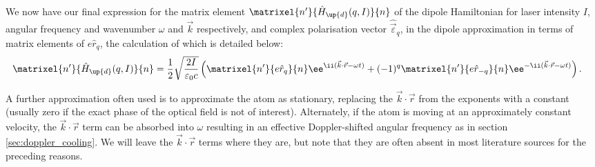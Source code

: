 We now have our final expression for the matrix element $\matrixel{n^\prime}{\hat H_\up{d}(q,I)}{n}$ of the dipole Hamiltonian for laser intensity $I$, angular frequency and wavenumber $\omega$ and $\vec k$ respectively, and complex polarisation vector $\hat{\vec\varepsilon}_q$, in the dipole approximation in terms of matrix elements of $e\hat r_q$, the calculation of which is detailed below:
\begin{align}\label{eq:diple_matrixel_withminus}
\matrixel{n^\prime}{\hat H_\up{d}(q,I)}{n} &= 
\frac12\sqrt{\frac{2I}{\varepsilon_0 c}}\left(
\matrixel{n^\prime}
  {e\hat r_q}
  {n}\ee^{\ii(\vec k \cdot \vec r - \omega t)}
+(-1)^q
\matrixel{n^\prime}
  {e\hat r_{-q}}
  {n} \ee^{-\ii(\vec k \cdot \vec r - \omega t)}\right).
\end{align}

A further approximation often used is to approximate the atom as stationary, replacing the $\vec k\cdot\vec r$ from the exponents with a constant (usually zero if the exact phase of the optical field is not of interest). Alternately, if the atom is moving at an approximately constant velocity, the $\vec k \cdot\vec r$ term can be absorbed into $\omega$ resulting in an effective Doppler-shifted angular frequency as in section \ref{sec:doppler_cooling}. We will leave the $\vec k\cdot\vec r$ terms where they are, but note that they are often absent in most literature sources for the preceding reasons.

